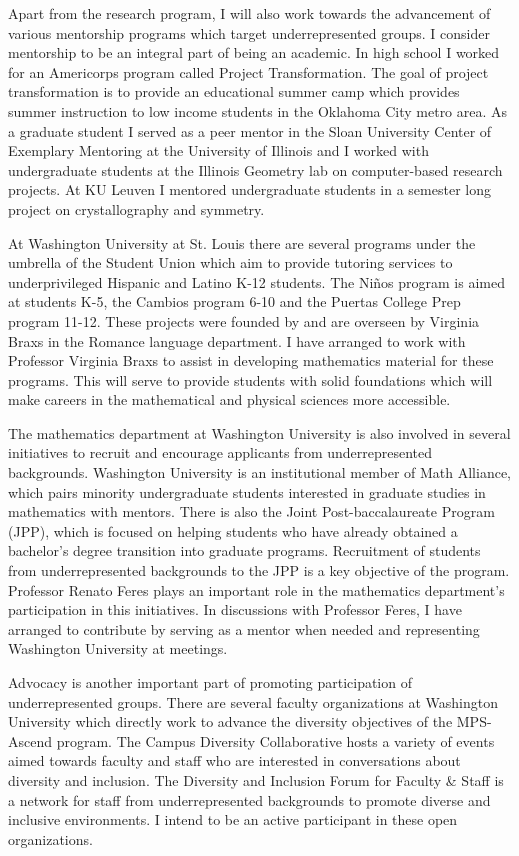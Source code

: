 \documentclass[11pt, letterpaper]{article}
\begin{document}
Apart from the research program, I will also work towards the advancement of various mentorship programs which target underrepresented groups. I consider mentorship to be an integral part of being an academic. In high school I worked for an Americorps program called Project Transformation. The goal of project transformation is to provide an educational summer camp which provides summer instruction to low income students in the Oklahoma City metro area. As a graduate student I served as a peer mentor in the Sloan University Center of Exemplary Mentoring at the University of Illinois and I worked with undergraduate students at the Illinois Geometry lab on computer-based research projects. At KU Leuven I mentored undergraduate students in a semester long project on crystallography and symmetry.

At Washington University at St. Louis there are several programs under the umbrella of the Student Union which aim to provide tutoring services to underprivileged Hispanic and Latino K-12 students. The Niños program is aimed at students K-5, the Cambios program 6-10 and the Puertas College Prep program 11-12. These projects were founded by and are overseen by Virginia Braxs in the Romance language department. I have arranged to work with Professor Virginia Braxs to assist in developing mathematics material for these programs. This will serve to provide students with solid foundations which will make careers in the mathematical and physical sciences more accessible.

The mathematics department at Washington University is also involved in several initiatives to recruit and encourage applicants from underrepresented backgrounds. Washington University is an institutional member of Math Alliance, which pairs minority undergraduate students interested in graduate studies in mathematics with mentors. There is also the Joint Post-baccalaureate Program (JPP), which is focused on helping students who have already obtained a bachelor's degree transition into graduate programs. Recruitment of students from underrepresented backgrounds to the JPP is a key objective of the program. Professor Renato Feres plays an important role in the mathematics department's participation in this initiatives. In discussions with Professor Feres, I have arranged to contribute by serving as a mentor when needed and representing Washington University at meetings.

Advocacy is another important part of promoting participation of underrepresented groups. There are several faculty organizations at Washington University which directly work to advance the diversity objectives of the MPS-Ascend program. The Campus Diversity Collaborative hosts a variety of events aimed towards faculty and staff who are interested in conversations about diversity and inclusion. The Diversity and Inclusion Forum for Faculty \& Staff is a network for staff from underrepresented backgrounds to promote diverse and inclusive environments. I intend to be an active participant in these open organizations.
\newpage
\renewcommand{\refname}{References Cited}


\end{document}
